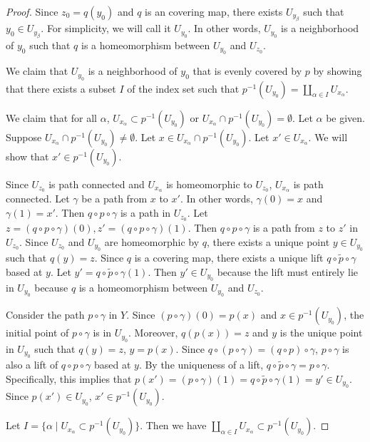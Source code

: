\documentclass[12pt, psamsfonts]{amsart}
\theoremstyle{definition}
\theoremstyle{remark}
\numberwithin{equation}{section}
\begin{document}
\begin{proof}
  Since $z_0 = q(y_0)$ and $q$ is an covering map, there exists $U_{y_{\beta}}$ such that $y_0 \in U_{y_{\beta}}$.
  For simplicity, we will call it $U_{y_0}$.
  In other words, $U_{y_0}$ is a neighborhood of $y_0$ such that $q$ is a homeomorphism between $U_{y_0}$ and $U_{z_0}$.

  We claim that $U_{y_0}$ is a neighborhood of $y_0$ that is evenly covered by $p$ by showing that there exists a subset $I$ of the index set such that $p^{-1}(U_{y_0}) = \coprod_{\alpha \in I} U_{x_{\alpha}}$.


  We claim that for all $\alpha$, $U_{x_{\alpha}} \subset p^{-1}(U_{y_0})$ or $U_{x_{\alpha}} \cap p^{-1}(U_{y_0}) = \emptyset$.
  Let $\alpha$ be given.
  Suppose $U_{x_{\alpha}} \cap p^{-1}(U_{y_0}) \ne \emptyset$.
  Let $x \in U_{x_{\alpha}} \cap p^{-1}(U_{y_0})$.
  Let $x' \in U_{x_{\alpha}}$.
  We will show that $x' \in p^{-1}(U_{y_0})$.

  Since $U_{z_0}$ is path connected and $U_{x_{\alpha}}$ is homeomorphic to $U_{z_0}$, $U_{x_{\alpha}}$ is path connected.
  Let $\gamma$ be a path from $x$ to $x'$.
  In other words, $\gamma(0) = x$ and $\gamma(1) = x'$.
  Then $q \circ p \circ \gamma$ is a path in $U_{z_0}$.
  Let $z = (q \circ p \circ \gamma)(0), z' = (q \circ p \circ \gamma)(1)$.
  Then $q \circ p \circ \gamma$ is a path from $z$ to $z'$ in $U_{z_0}$.
  Since $U_{z_0}$ and $U_{y_0}$ are homeomorphic by $q$, there exists a unique point $y \in U_{y_0}$ such that $q(y) = z$.
  Since $q$ is a covering map, there exists a unique lift $\widetilde{q \circ p \circ \gamma}$ based at $y$.
  Let $y' = \widetilde{q \circ p \circ \gamma}(1)$.
  Then $y' \in U_{y_0}$ because the lift must entirely lie in $U_{y_0}$ because $q$ is a homeomorphism between $U_{y_0}$ and $U_{z_0}$.

  Consider the path $p \circ \gamma$ in $Y$.
  Since $(p \circ \gamma)(0) = p(x)$ and $x \in p^{-1}(U_{y_0})$, the initial point of $p \circ \gamma$ is in $U_{y_0}$.
  Moreover, $q(p(x)) = z$ and $y$ is the unique point in $U_{y_0}$ such that $q(y) = z$, $y = p(x)$.
  Since $q \circ (p \circ \gamma) = (q \circ p) \circ \gamma$, $p \circ \gamma$ is also a lift of $q \circ p \circ \gamma$ based at $y$.
  By the uniqueness of a lift, $\widetilde{q \circ p \circ \gamma} = p \circ \gamma$.
  Specifically, this implies that $p(x') = (p \circ \gamma)(1) = \widetilde{q \circ p \circ \gamma}(1) = y' \in U_{y_0}$.
  Since $p(x') \in U_{y_0}$, $x' \in p^{-1}(U_{y_0})$.

  Let $I = \{ \alpha \mid U_{x_{\alpha}} \subset p^{-1}(U_{y_0}) \}$.
  Then we have $\coprod_{\alpha \in I} U_{x_{\alpha}} \subset p^{-1}(U_{y_0})$.


\end{proof}
\end{document}
